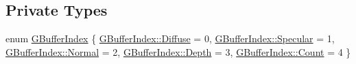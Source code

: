\subsection*{Private Types}
\begin{DoxyCompactItemize}
\item 
enum \hyperlink{structmage_1_1_g_buffer_a72f0fc0f46052fdc9872c48c57894607}{G\+Buffer\+Index} \{ \newline
\hyperlink{structmage_1_1_g_buffer_a72f0fc0f46052fdc9872c48c57894607a41178642cae095a6bdb909119b4d16e8}{G\+Buffer\+Index\+::\+Diffuse} = 0, 
\hyperlink{structmage_1_1_g_buffer_a72f0fc0f46052fdc9872c48c57894607a39b0044dd8789d333e7794f359406740}{G\+Buffer\+Index\+::\+Specular} = 1, 
\hyperlink{structmage_1_1_g_buffer_a72f0fc0f46052fdc9872c48c57894607a960b44c579bc2f6818d2daaf9e4c16f0}{G\+Buffer\+Index\+::\+Normal} = 2, 
\hyperlink{structmage_1_1_g_buffer_a72f0fc0f46052fdc9872c48c57894607a675056ad1441b6375b2c5abd48c27ef1}{G\+Buffer\+Index\+::\+Depth} = 3, 
\newline
\hyperlink{structmage_1_1_g_buffer_a72f0fc0f46052fdc9872c48c57894607ae93f994f01c537c4e2f7d8528c3eb5e9}{G\+Buffer\+Index\+::\+Count} = 4
 \}
\end{DoxyCompactItemize}
